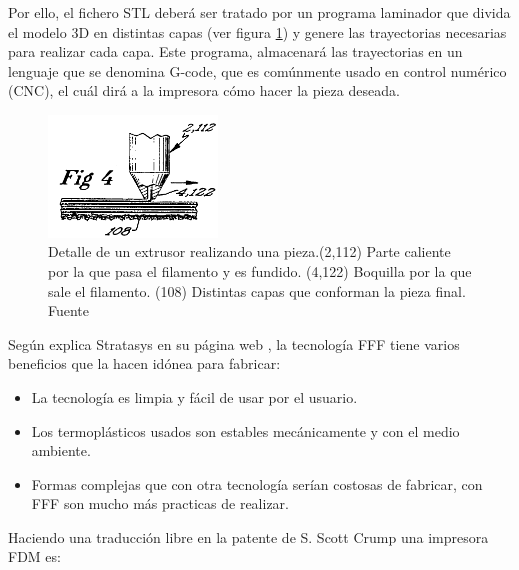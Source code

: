 Por ello, el fichero STL deberá ser tratado por un programa laminador que divida el modelo 3D en distintas capas (ver figura \ref{fig:detalle_capas}) y genere las trayectorias necesarias para realizar cada capa. Este programa, almacenará las trayectorias en un lenguaje que se denomina G-code, que es comúnmente usado en control numérico (CNC), el cuál dirá a la impresora cómo hacer la pieza deseada.

\begin{figure}[H]
    \centering
    \includegraphics[width=0.4\textwidth]{images/capas_fdm.png}
    \caption[Detalle  de un extrusor realizando una pieza.]{Detalle  de un extrusor realizando una pieza.(2,112) Parte caliente por la que pasa el filamento y es fundido. (4,122) Boquilla por la que sale el filamento. (108) Distintas capas que conforman la pieza final. Fuente \cite{crump1992apparatus}}
    \label{fig:detalle_capas}
\end{figure}

Según explica Stratasys en su página web \cite{FDMTechnology}, la tecnología FFF tiene varios beneficios que la hacen idónea para fabricar:

\begin{itemize}
    \item La tecnología es limpia y fácil de usar por el usuario.
    \item Los termoplásticos usados son estables mecánicamente y con el medio ambiente.
    \item Formas complejas que con otra tecnología serían costosas de fabricar, con FFF son mucho más practicas de realizar.
\end{itemize}

Haciendo una traducción libre en la patente de S. Scott Crump \cite{crump1992apparatus} una impresora FDM es:

